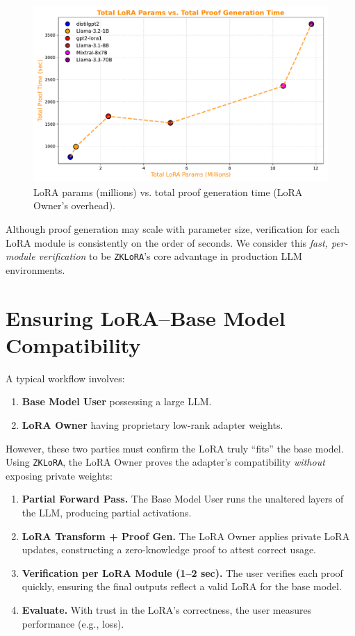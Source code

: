 \documentclass[11pt]{article}
\begin{document}
\begin{figure}[ht]
    \centering
    \includegraphics[width=0.58\linewidth]{figs/fig_proof.pdf}
    \caption{LoRA params (millions) vs. total proof generation time (LoRA Owner’s overhead).}
    \label{fig:proof}
\end{figure}

Although proof generation may scale with parameter size, verification for each LoRA module is consistently on the order of seconds. We consider this \emph{fast, per-module verification} to be \texttt{ZKLoRA}’s core advantage in production LLM environments.

\section{Ensuring LoRA–Base Model Compatibility}

A typical workflow involves:
\begin{enumerate}
    \item \textbf{Base Model User} possessing a large LLM. 
    \item \textbf{LoRA Owner} having proprietary low-rank adapter weights. 
\end{enumerate}
However, these two parties must confirm the LoRA truly “fits” the base model. Using \texttt{ZKLoRA}, the LoRA Owner proves the adapter’s compatibility \emph{without} exposing private weights:

\begin{enumerate}
    \item \textbf{Partial Forward Pass.}
    The Base Model User runs the unaltered layers of the LLM, producing partial activations.

    \item \textbf{LoRA Transform + Proof Gen.}
    The LoRA Owner applies private LoRA updates, constructing a zero-knowledge proof to attest correct usage.

    \item \textbf{Verification per LoRA Module (1--2 sec).}
    The user verifies each proof quickly, ensuring the final outputs reflect a valid LoRA for the base model.

    \item \textbf{Evaluate.}
    With trust in the LoRA’s correctness, the user measures performance (e.g., loss).
\end{enumerate}
\end{document}
